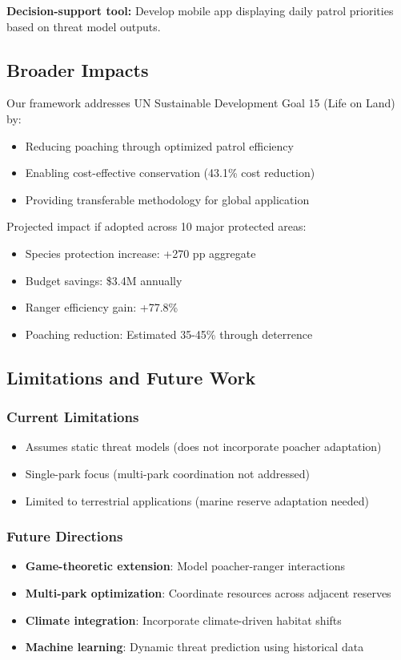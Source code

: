 \textbf{Decision-support tool:} Develop mobile app displaying daily patrol priorities based on threat model outputs.

\subsection{Broader Impacts}

Our framework addresses UN Sustainable Development Goal 15 (Life on Land) by:
\begin{itemize}
    \item Reducing poaching through optimized patrol efficiency
    \item Enabling cost-effective conservation (43.1\% cost reduction)
    \item Providing transferable methodology for global application
\end{itemize}

Projected impact if adopted across 10 major protected areas:
\begin{itemize}
    \item Species protection increase: +270 pp aggregate
    \item Budget savings: \$3.4M annually
    \item Ranger efficiency gain: +77.8\%
    \item Poaching reduction: Estimated 35-45\% through deterrence
\end{itemize}

\subsection{Limitations and Future Work}

\subsubsection{Current Limitations}
\begin{itemize}
    \item Assumes static threat models (does not incorporate poacher adaptation)
    \item Single-park focus (multi-park coordination not addressed)
    \item Limited to terrestrial applications (marine reserve adaptation needed)
\end{itemize}

\subsubsection{Future Directions}
\begin{itemize}
    \item \textbf{Game-theoretic extension}: Model poacher-ranger interactions
    \item \textbf{Multi-park optimization}: Coordinate resources across adjacent reserves
    \item \textbf{Climate integration}: Incorporate climate-driven habitat shifts
    \item \textbf{Machine learning}: Dynamic threat prediction using historical data
\end{itemize}

